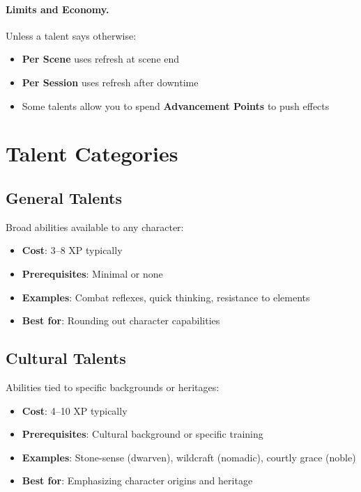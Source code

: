 \begin{multicols}{2}
\paragraph{Limits and Economy.}
Unless a talent says otherwise:
\begin{itemize}
\item \textbf{Per Scene} uses refresh at scene end
\item \textbf{Per Session} uses refresh after downtime
\item Some talents allow you to spend \textbf{Advancement Points} to push effects
\end{itemize}

\section{Talent Categories}

\subsection*{General Talents}
Broad abilities available to any character:
\begin{itemize}
\item \textbf{Cost}: 3--8 XP typically
\item \textbf{Prerequisites}: Minimal or none
\item \textbf{Examples}: Combat reflexes, quick thinking, resistance to elements
\item \textbf{Best for}: Rounding out character capabilities
\end{itemize}

\subsection*{Cultural Talents}
Abilities tied to specific backgrounds or heritages:
\begin{itemize}
\item \textbf{Cost}: 4--10 XP typically
\item \textbf{Prerequisites}: Cultural background or specific training
\item \textbf{Examples}: Stone-sense (dwarven), wildcraft (nomadic), courtly grace (noble)
\item \textbf{Best for}: Emphasizing character origins and heritage
\end{itemize}


\end{multicols}
